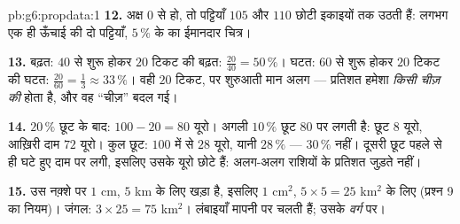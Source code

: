 \begin{solution}{pb:g6:propdata:1}
\textbf{12.} अक्ष $0$ से हो, तो पट्टियाँ $105$ और
$110$ छोटी इकाइयों तक उठती हैं: लगभग एक ही ऊँचाई की दो
पट्टियाँ, $5\,\%$ के  का ईमानदार चित्र।

\textbf{13.} बढ़त: $40$ से शुरू होकर $20$ टिकट की बढ़त:
$\frac{20}{40} = 50\,\%$। घटत: $60$ से शुरू होकर $20$
टिकट की घटत: $\frac{20}{60} = \frac13 \approx
33\,\%$। वही $20$ टिकट, पर शुरुआती मान अलग --- प्रतिशत हमेशा
\emph{किसी चीज़ की}  होता है, और वह ``चीज़'' बदल गई।

\textbf{14.} $20\,\%$ छूट के बाद: $100 - 20 = 80$ यूरो।
अगली $10\,\%$ छूट $80$ पर लगती है: छूट $8$ यूरो, आख़िरी दाम
$72$ यूरो। कुल छूट: $100$ में से $28$ यूरो, यानी
$28\,\%$ --- $30\,\%$ नहीं। दूसरी छूट पहले से ही घटे हुए दाम पर
लगी, इसलिए उसके यूरो छोटे हैं: अलग-अलग राशियों के प्रतिशत जुड़ते
नहीं।

\textbf{15.} उस नक़्शे पर $1$ cm, $5$ km के लिए खड़ा है, इसलिए
$1$ cm$^2$, $5 \times 5 = 25$ km$^2$ के लिए (प्रश्न 9 का नियम)।
जंगल: $3 \times 25 = 75$ km$^2$। लंबाइयाँ मापनी पर चलती हैं;
 उसके \emph{वर्ग} पर।

\end{solution}
